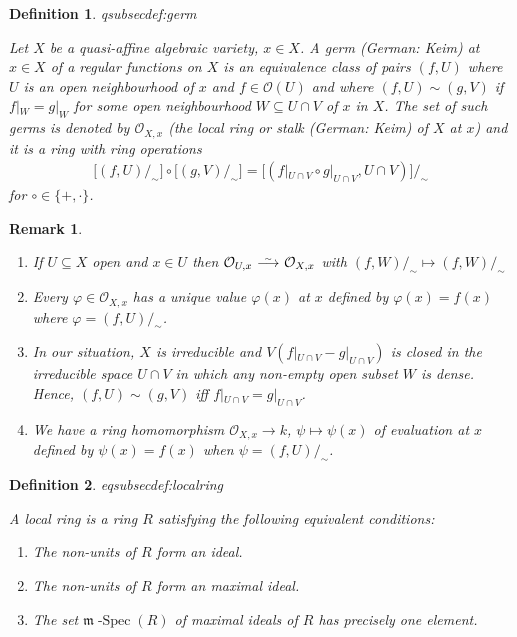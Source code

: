 \documentclass[DIV=14,parskip=full,pointednumbers]{scrartcl}
\renewcommand{\phi}{\varphi}
\newenvironment{alphanumerate}{\begin{enumerate}[label={$(\alph*)$},ref=\curthm]}{\end{enumerate}}
\theoremstyle{cthm}
\theoremstyle{cvarthm}
\theoremstyle{cdef}
\newtheorem{defi}{Definition}[subsection]
\newtheorem{rem}{Remark}[subsection]
\newcommand{\lbl}[1]{
	\label{#1}
	\ifmmode
	\expandafter\xdef\csname eqsubsec#1\endcsname{\thesubsection}
	\fi
}
\newcommand{\Oo}{\mathcal{O}}
\newcommand{\mm}{\mathfrak{m}}
\newcommand{\mSpec}{\mm\operatorname{-Spec}}
\newcommand{\isomorphism}{
	\tikz[baseline=(a.base)] \node (a) at (0,0) {$\longrightarrow$} node[above=-0.25ex] {\tiny $\sim$};}
\renewcommand{\phi}{\varphi}
\begin{document}
	\begin{defi}\lbl{def:germ}
		Let $X$ be a quasi-affine algebraic variety, $x\in X$. A \emph{germ} (German: \emph{Keim}) at $x\in X$ of a regular functions on $X$ is an equivalence class of pairs $(f,U)$ where $U$ is an open neighbourhood of $x$ and $f\in\Oo(U)$ and where $(f,U)\sim (g,V)$ if $f|_W = g|_W$ for some open neighbourhood $W\subseteq U\cap V$ of $x$ in $X$. The set of such germs is denoted by $\Oo_{X,x}$ (the \emph{local ring} or \emph{stalk} (German: \emph{Keim}) of $X$ at $x$) and it is a ring with ring operations
		\begin{align*}
			\big[(f,U)/_\sim\big] \circ \big[(g,V)/_\sim\big] = \big[(f|_{U\cap V} \circ g|_{U\cap V}, U\cap V)\big]/_\sim
		\end{align*}
		for $\circ\in\{+,\cdot\}$.
	\end{defi}
	\begin{rem}
	\begin{alphanumerate}
	\item 
		If $U\subseteq X$ open and $x\in U$ then $\Oo_{U,x} \isomorphism \Oo_{X,x}$ with $(f,W)/_\sim \mapsto (f,W)/_\sim$
	\item 
		Every $\phi\in \Oo_{X,x}$ has a unique value $\phi(x)$ at $x$ defined by $\phi(x) = f(x)$ where $\phi=(f,U)/_\sim$.
	\item 
		In our situation, $X$ is irreducible and $V(f|_{U\cap V} -g|_{U\cap V})$ is closed in the irreducible space $U\cap V$ in which any non-empty open subset $W$ is dense. Hence, $(f,U)\sim (g,V)$ iff $f|_{U\cap V} = g|_{U\cap V}$.
	\item 
		We have a ring homomorphism $\Oo_{X,x}\to k$, $\psi \mapsto \psi(x)$ of evaluation at $x$ defined by $\psi (x) = f(x)$ when $\psi = (f,U)/_\sim$.
	\end{alphanumerate}
 
	\end{rem}
	\begin{defi}\lbl{def:localring}
		A \emph{local ring} is a ring $R$ satisfying the following equivalent conditions:
		\begin{alphanumerate}
		\item 
			The non-units of $R$ form an ideal.
		\item 
			The non-units of $R$ form an maximal ideal.
		\item 
			The set $\mSpec(R)$ of maximal ideals of $R$ has precisely one element.
		\end{alphanumerate}
	\end{defi}
\end{document}
